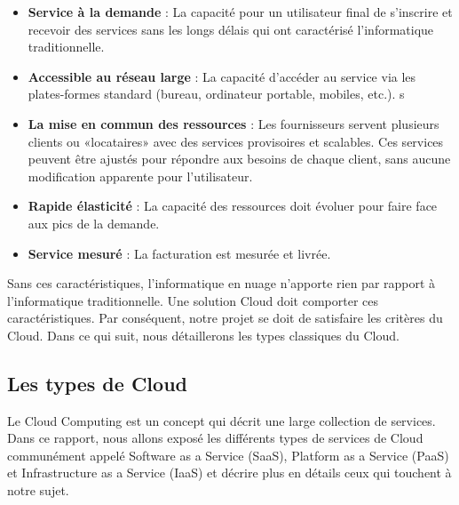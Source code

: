 \begin{onehalfspace}
\begin{itemize}

\item \textbf{Service à la demande} : La capacité pour un utilisateur final de s'inscrire et recevoir des services sans les longs délais qui ont caractérisé l'informatique traditionnelle.

\item \textbf{Accessible au réseau large} : La capacité d'accéder au service via les plates-formes standard (bureau, ordinateur portable, mobiles, etc.).
s
\item \textbf{La mise en commun des ressources} : Les fournisseurs servent plusieurs clients ou «locataires» avec des services provisoires et scalables. Ces services peuvent être ajustés pour répondre aux besoins de chaque client, sans aucune modification apparente pour l'utilisateur.

\item \textbf{Rapide élasticité} : La capacité des ressources doit évoluer pour faire face aux pics de la demande.

\item \textbf{Service mesuré} : La facturation est mesurée et livrée.
 	
\end{itemize}


Sans ces caractéristiques, l'informatique en nuage n'apporte rien par rapport à l'informatique traditionnelle. Une solution Cloud doit comporter ces caractéristiques. Par conséquent, notre projet se doit de satisfaire les critères du Cloud. Dans ce qui suit, nous détaillerons les types classiques du Cloud.

\subsection{Les types de Cloud}

Le Cloud Computing est un concept qui décrit une large collection de services. Dans ce rapport, nous allons exposé les différents types de services de Cloud communément appelé Software as a Service (SaaS),  Platform as a Service (PaaS) et Infrastructure as a Service (IaaS) et décrire plus en détails ceux qui touchent à notre sujet.


\end{onehalfspace}
